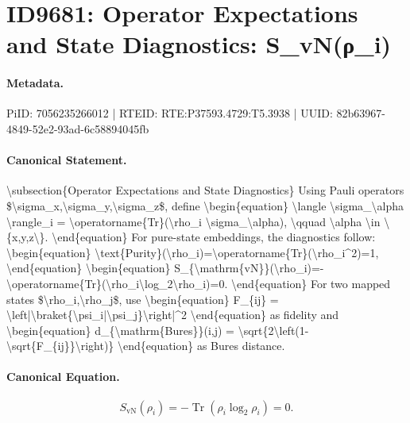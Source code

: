 \section*{ID9681: Operator Expectations and State Diagnostics: S\_vN(ρ\_i)}
\paragraph{Metadata.}
PiID: 7056235266012 | RTEID: RTE:P37593.4729:T5.3938 | UUID: 82b63967-4849-52e2-93ad-6c58894045fb

\paragraph{Canonical Statement.}
\textbackslash{}subsection\{Operator Expectations and State Diagnostics\} Using Pauli operators \$\textbackslash{}sigma\_x,\textbackslash{}sigma\_y,\textbackslash{}sigma\_z\$, define \textbackslash{}begin\{equation\} \textbackslash{}langle \textbackslash{}sigma\_\textbackslash{}alpha \textbackslash{}rangle\_i = \textbackslash{}operatorname\{Tr\}(\textbackslash{}rho\_i \textbackslash{}sigma\_\textbackslash{}alpha), \textbackslash{}qquad \textbackslash{}alpha \textbackslash{}in \textbackslash{}\{x,y,z\textbackslash{}\}. \textbackslash{}end\{equation\} For pure-state embeddings, the diagnostics follow: \textbackslash{}begin\{equation\} \textbackslash{}text\{Purity\}(\textbackslash{}rho\_i)=\textbackslash{}operatorname\{Tr\}(\textbackslash{}rho\_i\textasciicircum{}2)=1, \textbackslash{}end\{equation\} \textbackslash{}begin\{equation\} S\_\{\textbackslash{}mathrm\{vN\}\}(\textbackslash{}rho\_i)=-\textbackslash{}operatorname\{Tr\}(\textbackslash{}rho\_i\textbackslash{}log\_2\textbackslash{}rho\_i)=0. \textbackslash{}end\{equation\} For two mapped states \$\textbackslash{}rho\_i,\textbackslash{}rho\_j\$, use \textbackslash{}begin\{equation\} F\_\{ij\} = \textbackslash{}left|\textbackslash{}braket\{\textbackslash{}psi\_i|\textbackslash{}psi\_j\}\textbackslash{}right|\textasciicircum{}2 \textbackslash{}end\{equation\} as fidelity and \textbackslash{}begin\{equation\} d\_\{\textbackslash{}mathrm\{Bures\}\}(i,j) = \textbackslash{}sqrt\{2\textbackslash{}left(1-\textbackslash{}sqrt\{F\_\{ij\}\}\textbackslash{}right)\} \textbackslash{}end\{equation\} as Bures distance.

\paragraph{Canonical Equation.}
\[
S_{\mathrm{vN}}(\rho_i)=-\operatorname{Tr}(\rho_i\log_2\rho_i)=0.
\]

